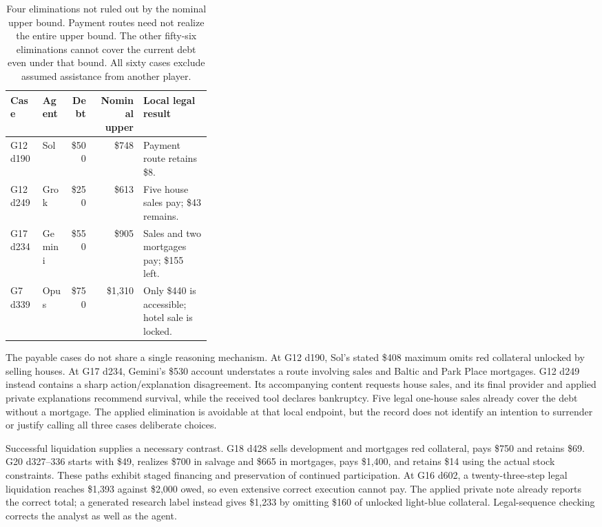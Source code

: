 \begin{table}[t]
\centering
\small
\begin{tabular}{llrrp{0.34\linewidth}}
\toprule
Case & Agent & Debt & Nominal upper & Local legal result \\
\midrule
G12 d190 & Sol & \$500 & \$748 & Payment route retains \$8. \\
G12 d249 & Grok & \$250 & \$613 & Five house sales pay; \$43 remains. \\
G17 d234 & Gemini & \$550 & \$905 & Sales and two mortgages pay; \$155 left. \\
G7 d339 & Opus & \$750 & \$1,310 & Only \$440 is accessible; hotel sale is locked. \\
\bottomrule
\end{tabular}
\caption{Four eliminations not ruled out by the nominal upper bound. Payment routes need not realize the entire upper bound. The other fifty-six eliminations cannot cover the current debt even under that bound. All sixty cases exclude assumed assistance from another player.}
\label{tab:sol-financing}
\end{table}

The payable cases do not share a single reasoning mechanism. At G12 d190, Sol's stated \$408 maximum omits red collateral unlocked by selling houses. At G17 d234, Gemini's \$530 account understates a route involving sales and Baltic and Park Place mortgages. G12 d249 instead contains a sharp action/explanation disagreement. Its accompanying content requests house sales, and its final provider and applied private explanations recommend survival, while the received tool declares bankruptcy. Five legal one-house sales already cover the debt without a mortgage. The applied elimination is avoidable at that local endpoint, but the record does not identify an intention to surrender or justify calling all three cases deliberate choices.

Successful liquidation supplies a necessary contrast. G18 d428 sells development and mortgages red collateral, pays \$750 and retains \$69. G20 d327--336 starts with \$49, realizes \$700 in salvage and \$665 in mortgages, pays \$1,400, and retains \$14 using the actual stock constraints. These paths exhibit staged financing and preservation of continued participation. At G16 d602, a twenty-three-step legal liquidation reaches \$1,393 against \$2,000 owed, so even extensive correct execution cannot pay. The applied private note already reports the correct total; a generated research label instead gives \$1,233 by omitting \$160 of unlocked light-blue collateral. Legal-sequence checking corrects the analyst as well as the agent.

